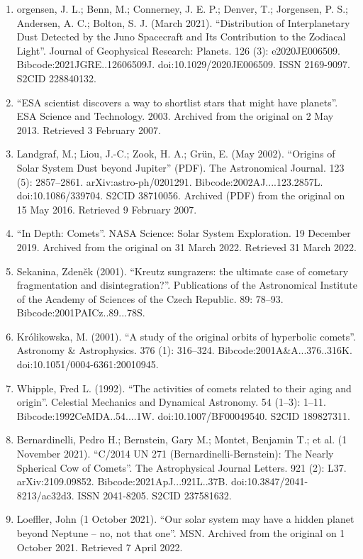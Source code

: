 \begin{enumerate}
\item orgensen, J. L.; Benn, M.; Connerney, J. E. P.; Denver, T.; Jorgensen, P. S.; Andersen, A. C.; Bolton, S. J. (March 2021). ``Distribution of Interplanetary Dust Detected by the Juno Spacecraft and Its Contribution to the Zodiacal Light''. Journal of Geophysical Research: Planets. 126 (3): e2020JE006509. Bibcode:2021JGRE..12606509J. doi:10.1029/2020JE006509. ISSN 2169-9097. S2CID 228840132.
\item ``ESA scientist discovers a way to shortlist stars that might have planets''. ESA Science and Technology. 2003. Archived from the original on 2 May 2013. Retrieved 3 February 2007.
\item Landgraf, M.; Liou, J.-C.; Zook, H. A.; Grün, E. (May 2002). ``Origins of Solar System Dust beyond Jupiter'' (PDF). The Astronomical Journal. 123 (5): 2857–2861. arXiv:astro-ph/0201291. Bibcode:2002AJ....123.2857L. doi:10.1086/339704. S2CID 38710056. Archived (PDF) from the original on 15 May 2016. Retrieved 9 February 2007.
\item ``In Depth: Comets''. NASA Science: Solar System Exploration. 19 December 2019. Archived from the original on 31 March 2022. Retrieved 31 March 2022.
\item Sekanina, Zdeněk (2001). ``Kreutz sungrazers: the ultimate case of cometary fragmentation and disintegration?''. Publications of the Astronomical Institute of the Academy of Sciences of the Czech Republic. 89: 78–93. Bibcode:2001PAICz..89...78S.
\item Królikowska, M. (2001). ``A study of the original orbits of hyperbolic comets''. Astronomy \& Astrophysics. 376 (1): 316–324. Bibcode:2001A\&A...376..316K. doi:10.1051/0004-6361:20010945.
\item Whipple, Fred L. (1992). ``The activities of comets related to their aging and origin''. Celestial Mechanics and Dynamical Astronomy. 54 (1–3): 1–11. Bibcode:1992CeMDA..54....1W. doi:10.1007/BF00049540. S2CID 189827311.
\item Bernardinelli, Pedro H.; Bernstein, Gary M.; Montet, Benjamin T.; et al. (1 November 2021). ``C/2014 UN 271 (Bernardinelli-Bernstein): The Nearly Spherical Cow of Comets''. The Astrophysical Journal Letters. 921 (2): L37. arXiv:2109.09852. Bibcode:2021ApJ...921L..37B. doi:10.3847/2041-8213/ac32d3. ISSN 2041-8205. S2CID 237581632.
\item Loeffler, John (1 October 2021). ``Our solar system may have a hidden planet beyond Neptune – no, not that one''. MSN. Archived from the original on 1 October 2021. Retrieved 7 April 2022.

\end{enumerate}
